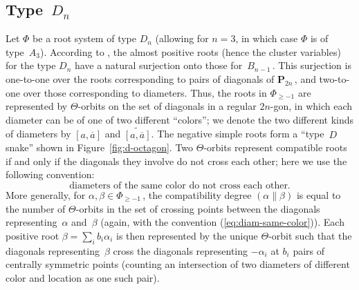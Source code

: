 \documentclass[letterpaper]{amsart}
\numberwithin{equation}{section}
\theoremstyle{definition}
\def\Poly{\mathbf{P}}
\begin{document}
\subsection{Type~$D_n$} 
\label{sec:ca-type-D} 
Let $\Phi$ be a root system of type $D_n$ 
(allowing for $n=3$, in which case $\Phi$ is of type~$A_3$). 
According to \cite[Section~3.5]{yga}, the almost positive roots 
(hence the cluster variables) for the type $D_n$ 
have a natural surjection onto those for~$B_{n-1}\,$. 
This surjection is one-to-one over the roots 
corresponding to pairs of diagonals of 
$\Poly_{2n}\,$, and two-to-one over those corresponding to diameters. 
Thus, the roots in $\Phi_{\geq -1}$ are represented 
by $\Theta$-orbits on the set of diagonals in a regular $2n$-gon, 
in which each diameter can be of one of two different ``colors''; 
we denote the two different kinds of diameters by 
$[a, \overline a]$ and $\widetilde{[a, \overline a]}$. 
The negative simple roots form a ``type~$D$ snake'' shown in 
 Figure~\ref{fig:d-octagon}. 
Two $\Theta$-orbits represent compatible roots if and 
only if the diagonals they involve do not cross each other; 
here we use the following convention: 
\begin{equation} 
\label{eq:diam-same-color} 
\text{diameters of the same color do not cross each other.} 
\end{equation} 
More generally, for $\alpha, \beta \in \Phi_{\geq -1}\,$, the 
compatibility degree 
$(\alpha \| \beta)$ is equal to the number of $\Theta$-orbits in the 
set of crossing points between the diagonals representing~$\alpha$ 
and~$\beta$ (again, with the convention (\ref{eq:diam-same-color})). 
Each positive root $\beta=\sum_{i} b_i \alpha_i$ 
is then represented by the unique 
$\Theta$-orbit such that the diagonals representing~$\beta$ 
cross the diagonals representing $-\alpha_i$ at $b_i$ pairs of 
centrally symmetric points (counting an intersection of two diameters 
of different color and location as one such pair). 
 
\end{document}
